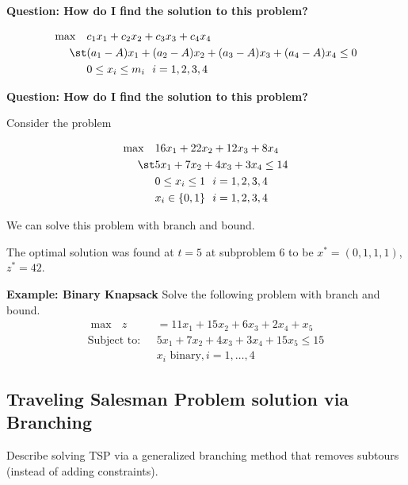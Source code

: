 \documentclass[../open-optimization/open-optimization.tex]{subfiles}
\begin{document}
\textbf{Question: How do I find the solution to this problem?}


\begin{align*}
\max \quad & c_1 x_1 + c_2 x_2 + c_3 x_3 + c_4 x_4\\
\st & (a_1 - A)x_1 + (a_2-A) x_2 + (a_3-A) x_3 + (a_4-A) x_4 \leq 0\\
& 0 \leq x_i \leq m_i \ \ i=1,2,3,4\\
\end{align*}

\textbf{Question: How do I find the solution to this problem?}



Consider the problem 

\begin{align*}
\max \quad & 16x_1 + 22x_2 + 12x_3 + 8 x_4\\
\st & 5x_1 + 7x_2 + 4x_3 + 3x_4 \leq 14\\
& 0 \leq x_i \leq 1 \ \ i=1,2,3,4\\
& x_i \in \{0,1\} \ \ i=1,2,3,4
\end{align*}

We can solve this problem with branch and bound.


The optimal solution was found at $t=5$ at subproblem 6 to be $x^* = (0,1,1,1)$, $z^* = 42$.



\textbf{Example: Binary Knapsack}
Solve the following problem with branch and bound.
\begin{align*}
\max\ \ \   z&=11x_1+15x_2+6x_3+2x_4 + x_5\\
\text{Subject to:} \ \ \ 	 &5x_1+7x_2+4x_3+3x_4 + 15x_5\leq15\\
		&x_i  \text{  binary},i=1,\dots,4
\end{align*}




\subsection{Traveling Salesman Problem solution via Branching}


\begin{todo}
Describe solving TSP via a generalized branching method that removes subtours (instead of adding constraints).
\end{todo}
\end{document}
